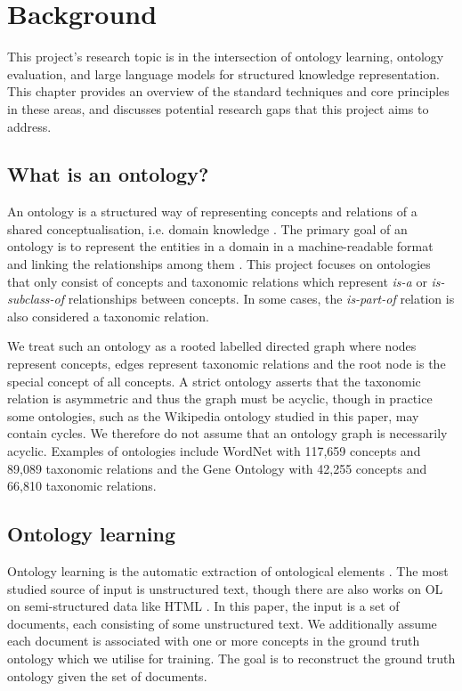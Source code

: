 \chapter{Background}

This project's research topic is in the intersection of ontology learning, ontology evaluation, and large language models for structured knowledge representation. This chapter provides an overview of the standard techniques and core principles in these areas, and discusses potential research gaps that this project aims to address.

\section{What is an ontology?}

An ontology is a structured way of representing concepts and relations of a shared conceptualisation, i.e. domain knowledge \cite{gruber1995toward,gruber1993translation}. The primary goal of an ontology is to represent the entities in a domain in a machine-readable format and linking the relationships among them \cite{national2022ontologies}. This project focuses on ontologies that only consist of concepts and taxonomic relations which represent \emph{is-a} or \emph{is-subclass-of} relationships between concepts. In some cases, the \emph{is-part-of} relation is also considered a taxonomic relation.

We treat such an ontology as a rooted labelled directed graph where nodes represent concepts, edges represent taxonomic relations and the root node is the special concept of all concepts. A strict ontology asserts that the taxonomic relation is asymmetric and thus the graph must be acyclic, though in practice some ontologies, such as the Wikipedia ontology studied in this paper, may contain cycles. We therefore do not assume that an ontology graph is necessarily acyclic. Examples of ontologies include WordNet \cite{miller1995wordnet} with 117,659 concepts and 89,089 taxonomic relations and the Gene Ontology \cite{ashburner2000gene} with 42,255 concepts and 66,810 taxonomic relations.

\section{Ontology learning}

Ontology learning is the automatic extraction of ontological elements \cite{hazman2011survey}. The most studied source of input is unstructured text, though there are also works on OL on semi-structured data like HTML \cite{karoui2004ontology}. In this paper, the input is a set of documents, each consisting of some unstructured text. We additionally assume each document is associated with one or more concepts in the ground truth ontology which we utilise for training. The goal is to reconstruct the ground truth ontology given the set of documents.

